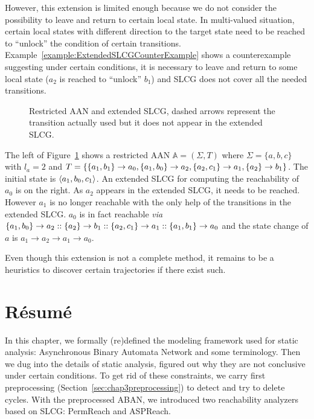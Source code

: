 However, this extension is limited enough because we do not consider the possibility to leave and return to certain local state.
In multi-valued situation, certain local states with different direction to the target state need to be reached to ``unlock'' the condition of certain transitions.
Example~\ref{example:ExtendedSLCGCounterExample} shows a counterexample suggesting under certain conditions, it is necessary to leave and return to some local state ($a_2$ is reached to ``unlock'' $b_1$) and SLCG does not cover all the needed transitions.
\begin{figure}[ht]
    \centering
    
    \caption[Counterexample of extended SLCG]{Restricted AAN and extended SLCG, dashed arrows represent the transition actually used but it does not appear in the extended SLCG.}
    \label{fig:ExtendedSLCGCounterExample}
\end{figure}
\begin{example}\label{example:ExtendedSLCGCounterExample}
The left of Figure~\ref{fig:ExtendedSLCGCounterExample} shows a restricted AAN $\mathbb{A}=(\Sigma,T)$ where $\Sigma=\{a,b,c\} $ with $l_a=2$ and $T=\{\{a_1,b_1\}\rightarrow a_0,\{a_1,b_0\}\rightarrow a_2,\{a_2,c_1\}\rightarrow a_1,\{a_2\}\rightarrow b_1\}$.
The initial state is $\langle a_1,b_0,c_1\rangle$.
An extended SLCG for computing the reachability of $a_0$ is on the right.
As $a_2$ appears in the extended SLCG, it needs to be reached.
However $a_1$ is no longer reachable with the only help of the transitions in the extended SLCG.
$a_0$ is in fact reachable \textit{via} $\{a_1,b_0\}\rightarrow a_2::\{a_2\}\rightarrow b_1::\{a_2,c_1\}\rightarrow a_1::\{a_1,b_1\}\rightarrow a_0$ and the state change of $a$ is $a_1\to a_2\to a_1\to a_0$.
\end{example}

Even though this extension is not a complete method, it remains to be a heuristics to discover certain trajectories if there exist such.

\section{R\'esum\'e}
In this chapter, we formally (re)defined the modeling framework used for static analysis: Asynchronous Binary Automata Network and some terminology.
Then we dug into the details of static analysis, figured out why they are not conclusive under certain conditions.
To get rid of these constraints, we carry first preprocessing (Section~\ref{sec:chap3preprocessing}) to detect and try to delete cycles.
With the preprocessed ABAN, we introduced two reachability analyzers based on SLCG: PermReach and ASPReach.

